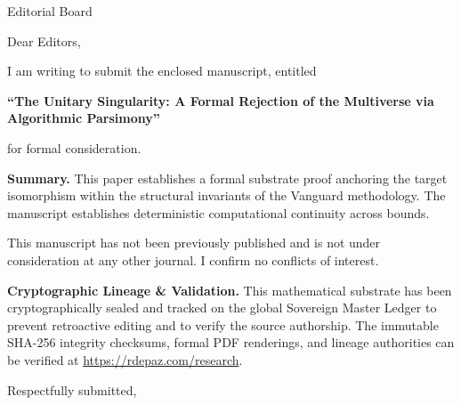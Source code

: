 \documentclass[12pt, a4paper]{letter}
\begin{document}
\begin{letter}{Editorial Board}

\opening{Dear Editors,}

I am writing to submit the enclosed manuscript, entitled

\begin{center}
\textbf{``The Unitary Singularity:  
  A Formal Rejection of the Multiverse  
  via Algorithmic Parsimony''}
\end{center}

\noindent for formal consideration.

\medskip
\textbf{Summary.} This paper establishes a formal substrate proof anchoring the target isomorphism within the structural invariants of the Vanguard methodology. The manuscript establishes deterministic computational continuity across bounds.

\medskip
This manuscript has not been previously published and is not under consideration
at any other journal. I confirm no conflicts of interest.

\textbf{Cryptographic Lineage \& Validation.} This mathematical substrate has been cryptographically sealed and tracked on the global Sovereign Master Ledger to prevent retroactive editing and to verify the source authorship. The immutable SHA-256 integrity checksums, formal PDF renderings, and lineage authorities can be verified at \url{https://rdepaz.com/research}.

\medskip
\closing{Respectfully submitted,}
\end{letter}
\end{document}
